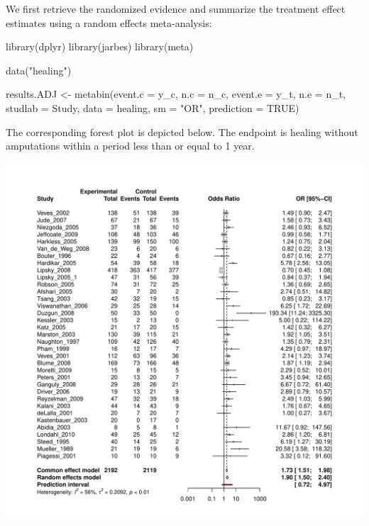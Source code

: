 \documentclass[
  letterpaper,
  DIV=11,
  numbers=noendperiod]{scrreprt}
\newenvironment{Shaded}{\begin{snugshade}}{\end{snugshade}}
\newcommand{\AttributeTok}[1]{\textcolor[rgb]{0.40,0.45,0.13}{#1}}
\newcommand{\ConstantTok}[1]{\textcolor[rgb]{0.56,0.35,0.01}{#1}}
\newcommand{\FunctionTok}[1]{\textcolor[rgb]{0.28,0.35,0.67}{#1}}
\newcommand{\NormalTok}[1]{\textcolor[rgb]{0.00,0.23,0.31}{#1}}
\newcommand{\OtherTok}[1]{\textcolor[rgb]{0.00,0.23,0.31}{#1}}
\newcommand{\StringTok}[1]{\textcolor[rgb]{0.13,0.47,0.30}{#1}}
\begin{document}
We first retrieve the randomized evidence and summarize the treatment
effect estimates using a random effects meta-analysis:

\begin{Shaded}
\begin{Highlighting}[]
\FunctionTok{library}\NormalTok{(dplyr)}
\FunctionTok{library}\NormalTok{(jarbes)}
\FunctionTok{library}\NormalTok{(meta)}

\FunctionTok{data}\NormalTok{(}\StringTok{"healing"}\NormalTok{)}

\NormalTok{results.ADJ }\OtherTok{\textless{}{-}} \FunctionTok{metabin}\NormalTok{(}\AttributeTok{event.c =}\NormalTok{ y\_c, }\AttributeTok{n.c =}\NormalTok{ n\_c,}
                       \AttributeTok{event.e =}\NormalTok{ y\_t, }\AttributeTok{n.e =}\NormalTok{ n\_t,}
                       \AttributeTok{studlab =}\NormalTok{ Study, }\AttributeTok{data =}\NormalTok{ healing,}
                       \AttributeTok{sm =} \StringTok{"OR"}\NormalTok{, }
                       \AttributeTok{prediction =} \ConstantTok{TRUE}\NormalTok{)}
\end{Highlighting}
\end{Shaded}

The corresponding forest plot is depicted below. The endpoint is healing
without amputations within a period less than or equal to 1 year.

\includegraphics{chapter_11_files/figure-pdf/unnamed-chunk-3-1.pdf}
\end{document}
